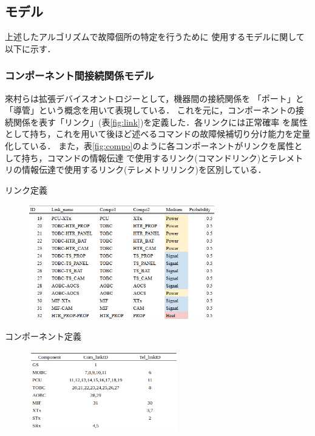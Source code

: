 \documentclass[11pt]{jsarticle}%
\begin{document}
\begin{multicols}{2}
\subsection{モデル}%
上述したアルゴリズムで故障個所の特定を行うために
使用するモデルに関して以下に示す．

\subsubsection{コンポーネント間接続関係モデル}
來村ら\cite{Kitamura01}は拡張デバイスオントロジーとして，機器間の接続関係を
「ポート」と「導管」という概念を用いて表現している．
これを元に，コンポーネントの接続関係を表す「リンク」(表\ref{fig:link})を定義した．各リンクには正常確率
を属性として持ち，これを用いて後ほど述べるコマンドの故障候補切り分け能力を定量化している．
また，表\ref{fig:compo}のように各コンポーネントがリンクを属性として持ち，コマンドの情報伝達
で使用するリンク(コマンドリンク)とテレメトリの情報伝達で使用するリンク(テレメトリリンク)を区別している．
\begin{table}[H]
  \centering
  \caption{リンク定義}
  \label{fig:link}
\end{table}
\vspace{-3zh}
\begin{figure}[H]
  \centering
    \includegraphics[height=5.0cm]{../figure/link_definition_resume.png}
\end{figure}
\vspace{-2zh}

\begin{table}[H]
  \centering
  \caption{コンポーネント定義}
  \label{fig:compo}
\end{table}
\vspace{-3zh}
\begin{figure}[H]
  \centering
    \includegraphics[height=3.5cm]{../figure/compo_link_resume.png}
\end{figure}


\end{multicols}
\end{document}
